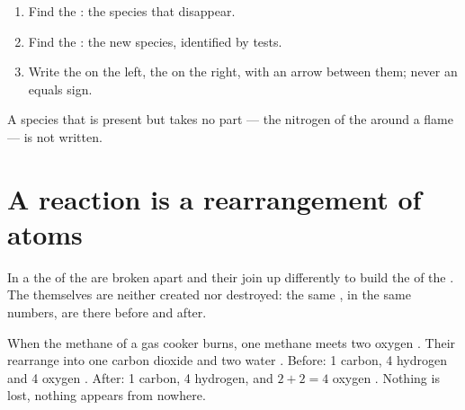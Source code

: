 \begin{method}\label{met:g7:chemical-reactions:write}
\begin{enumerate}
  \item Find the : the species that disappear.
  \item Find the : the new species, identified by tests.
  \item Write the  on the left, the  on the right,
        with an arrow between them; never an equals sign.
\end{enumerate}
A species that is present but takes no part --- the nitrogen of the 
around a flame --- is not written.
\end{method}

\section{A reaction is a rearrangement of atoms}

\begin{proposition}\label{prop:g7:chemical-reactions:rearranged}
In a  the  of the  are broken apart
and their  join up differently to build the  of the
. The  themselves are neither created nor destroyed: the
same , in the same numbers, are there before and after.
\end{proposition}

\begin{example}\label{ex:g7:chemical-reactions:methane}
When the methane of a gas cooker burns, one methane  
meets two oxygen  . Their  rearrange into one
carbon dioxide   and two water  .
Before: 1 carbon, 4 hydrogen and 4 oxygen . After: 1 carbon, 4
hydrogen, and $2 + 2 = 4$ oxygen . Nothing is lost, nothing
appears from nowhere.
\end{example}

